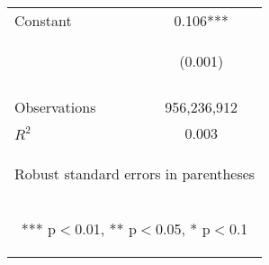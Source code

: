 \documentclass[]{article}
\begin{document}
\begin{center}
\begin{tabular}{lc}
Constant & 0.106*** \\
 & \begin{footnotesize}(0.001)\end{footnotesize} \\
\vspace{4pt} & \begin{footnotesize}\end{footnotesize} \\
Observations & 956,236,912 \\
 $R^2$ & 0.003 \\ \hline
\multicolumn{2}{c}{\begin{footnotesize} Robust standard errors in parentheses\end{footnotesize}} \\
\multicolumn{2}{c}{\begin{footnotesize} *** p$<$0.01, ** p$<$0.05, * p$<$0.1\end{footnotesize}} \\
\end{tabular}
\end{center}
\end{document}
